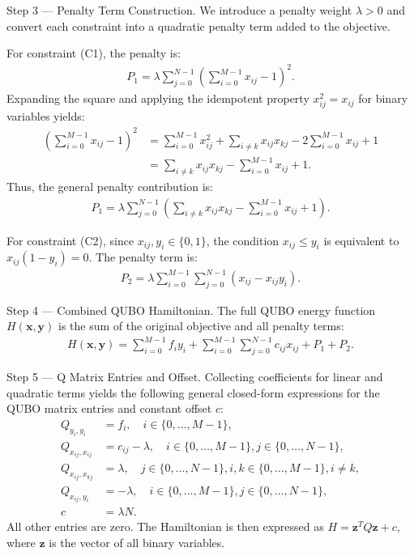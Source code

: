 \documentclass[12pt]{article}
\begin{document}
Step 3 --- Penalty Term Construction. We introduce a penalty weight $\lambda > 0$ and convert each constraint into a quadratic penalty term added to the objective.

For constraint (C1), the penalty is:
\begin{align}
P_1 = \lambda \sum_{j=0}^{N-1} \left( \sum_{i=0}^{M-1} x_{ij} - 1 \right)^2.
\end{align}
Expanding the square and applying the idempotent property $x_{ij}^2 = x_{ij}$ for binary variables yields:
\begin{align}
\left( \sum_{i=0}^{M-1} x_{ij} - 1 \right)^2 &= \sum_{i=0}^{M-1} x_{ij}^2 + \sum_{i \neq k} x_{ij}x_{kj} - 2\sum_{i=0}^{M-1} x_{ij} + 1 \nonumber \\
&= \sum_{i \neq k} x_{ij}x_{kj} - \sum_{i=0}^{M-1} x_{ij} + 1.
\end{align}
Thus, the general penalty contribution is:
\begin{align}
P_1 = \lambda \sum_{j=0}^{N-1} \left( \sum_{i \neq k} x_{ij}x_{kj} - \sum_{i=0}^{M-1} x_{ij} + 1 \right).
\end{align}

For constraint (C2), since $x_{ij}, y_i \in \{0,1\}$, the condition $x_{ij} \le y_i$ is equivalent to $x_{ij}(1-y_i) = 0$. The penalty term is:
\begin{align}
P_2 = \lambda \sum_{i=0}^{M-1} \sum_{j=0}^{N-1} (x_{ij} - x_{ij}y_i).
\end{align}

Step 4 --- Combined QUBO Hamiltonian. The full QUBO energy function $H(\mathbf{x},\mathbf{y})$ is the sum of the original objective and all penalty terms:
\begin{align}
H(\mathbf{x},\mathbf{y}) = \sum_{i=0}^{M-1} f_i y_i + \sum_{i=0}^{M-1} \sum_{j=0}^{N-1} c_{ij} x_{ij} + P_1 + P_2.
\end{align}

Step 5 --- Q Matrix Entries and Offset. Collecting coefficients for linear and quadratic terms yields the following general closed-form expressions for the QUBO matrix entries and constant offset $c$:
\begin{align}
Q_{y_i,y_i} &= f_i, \quad i \in \{0,\dots,M-1\}, \nonumber \\
Q_{x_{ij},x_{ij}} &= c_{ij} - \lambda, \quad i \in \{0,\dots,M-1\}, j \in \{0,\dots,N-1\}, \nonumber \\
Q_{x_{ij},x_{kj}} &= \lambda, \quad j \in \{0,\dots,N-1\}, i,k \in \{0,\dots,M-1\}, i \neq k, \nonumber \\
Q_{x_{ij},y_i} &= -\lambda, \quad i \in \{0,\dots,M-1\}, j \in \{0,\dots,N-1\}, \nonumber \\
c &= \lambda N.
\end{align}
All other entries are zero. The Hamiltonian is then expressed as $H = \mathbf{z}^T Q \mathbf{z} + c$, where $\mathbf{z}$ is the vector of all binary variables.
\end{document}
